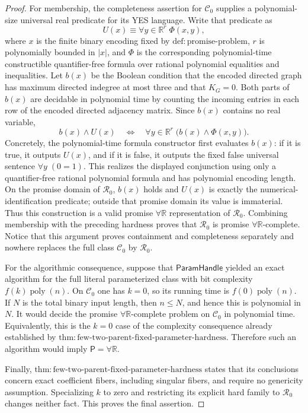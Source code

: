 \documentclass{article}
\begin{document}
\begin{proof}
For membership, the completeness assertion for \(\mathcal C_0\) supplies a polynomial-size universal real predicate for its YES language.  Write that predicate as
\[
U(x)\equiv \forall y\in\mathbb R^r\;\Phi(x,y),
\]
where \(x\) is the finite binary encoding fixed by \(\mathrm{def:promise\mbox{-}problem}\), \(r\) is polynomially bounded in \(\lvert x\rvert\), and \(\Phi\) is the corresponding polynomial-time constructible quantifier-free formula over rational polynomial equalities and inequalities.  Let \(b(x)\) be the Boolean condition that the encoded directed graph has maximum directed indegree at most three and that \(K_G=0\).  Both parts of \(b(x)\) are decidable in polynomial time by counting the incoming entries in each row of the encoded directed adjacency matrix.  Since \(b(x)\) contains no real variable,
\[
b(x)\wedge U(x)
\quad\Longleftrightarrow\quad
\forall y\in\mathbb R^r\;\bigl(b(x)\wedge\Phi(x,y)\bigr).
\]
Concretely, the polynomial-time formula constructor first evaluates \(b(x)\): if it is true, it outputs \(U(x)\), and if it is false, it outputs the fixed false universal sentence \(\forall y\;(0=1)\).  This realizes the displayed conjunction using only a quantifier-free rational polynomial formula and has polynomial encoding length.  On the promise domain of \(\mathcal R_0\), \(b(x)\) holds and \(U(x)\) is exactly the numerical-identification predicate; outside that promise domain its value is immaterial.  Thus this construction is a valid promise \(\forall\mathbb R\) representation of \(\mathcal R_0\).  Combining membership with the preceding hardness proves that \(\mathcal R_0\) is promise \(\forall\mathbb R\)-complete.  Notice that this argument proves containment and completeness separately and nowhere replaces the full class \(\mathcal C_0\) by \(\mathcal R_0\).

For the algorithmic consequence, suppose that \(\mathsf{ParamHandle}\) yielded an exact algorithm for the full literal parameterized class with bit complexity \(f(k)\operatorname{poly}(n)\).  On \(\mathcal C_0\) one has \(k=0\), so its running time is \(f(0)\operatorname{poly}(n)\).  If \(N\) is the total binary input length, then \(n\leq N\), and hence this is polynomial in \(N\).  It would decide the promise \(\forall\mathbb R\)-complete problem on \(\mathcal C_0\) in polynomial time.  Equivalently, this is the \(k=0\) case of the complexity consequence already established by \(\mathrm{thm:few\mbox{-}two\mbox{-}parent\mbox{-}fixed\mbox{-}parameter\mbox{-}hardness}\).  Therefore such an algorithm would imply \(\mathsf P=\forall\mathbb R\).

Finally, \(\mathrm{thm:few\mbox{-}two\mbox{-}parent\mbox{-}fixed\mbox{-}parameter\mbox{-}hardness}\) states that its conclusions concern exact coefficient fibers, including singular fibers, and require no genericity assumption.  Specializing \(k\) to zero and restricting its explicit hard family to \(\mathcal R_0\) changes neither fact.  This proves the final assertion.
\end{proof}
\end{document}
